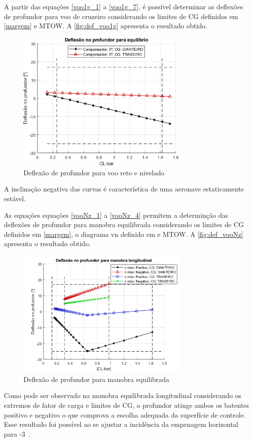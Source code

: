 A partir das equações \ref{voo1g_1} a \ref{voo1g_7}, é possível determinar as deflexões de profundor para voo de cruzeiro considerando os limites de CG definidos em \autoref{margem} e MTOW. A \autoref{fig:def_voo1g} apresenta o resultado obtido.

\begin{figure}[H]
\centering
\includegraphics[width=0.75\textwidth]{images/parte3/De_equi_c20.png}
\caption[Deflexão de profundor para voo reto e nivelado]{Deflexão de profundor para voo reto e nivelado}
\label{fig:def_voo1g}
\end{figure}

A inclinação negativa das curvas é característica de uma aeronave estaticamente estável.

As equações equações \ref{vooNz_1} a \ref{vooNz_4} permitem a determinção das deflexões de profundor para manobra equilibrada considerando os limites de CG definidos em \autoref{margem}, o diagrama vn definido em \label{diagramavn} e MTOW. A \autoref{fig:def_vooNz} apresenta o resultado obtido.

\begin{figure}[H]
\centering
\includegraphics[width=0.75\textwidth]{images/parte3/De_man_c20.png}
\caption[Deflexão de profundor para manobra equilibrada]{Deflexão de profundor para manobra equilibrada}
\label{fig:def_vooNz}
\end{figure}

Como pode ser observado na monobra equilibrada longitudinal considerando os extremos de fator de carga e limites de CG, o profundor atinge ambos os batentes positivo e negativo o que comprova a escolha adequada da superfície de controle. Esse resultado foi possível ao se ajustar a incidência da empenagem horizontal para -3\textdegree\ .
